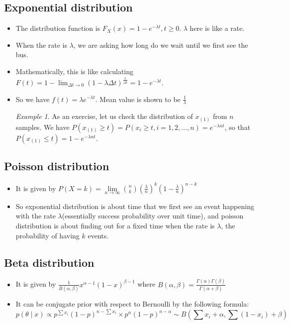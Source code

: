 \documentclass[11pt,reqno]{amsart}
\theoremstyle{remark}
\newtheorem{example}{Example}
\begin{document}
\subsection{Exponential distribution}
\begin{itemize}
\item The distribution function is $F_X(x)=1-e^{-\lambda t},t\geq 0$. $\lambda$ here is like a rate.
\item When the rate is $\lambda$, we are asking how long do we wait until we first see the bus.
\item Mathematically, this is like calculating $F(t)=1-\lim_{\Delta t\to 0}(1-\lambda\Delta t)^{\frac t{\Delta t}}=1-e^{-\lambda t}$.
\item So we have $f(t)=\lambda e^{-\lambda t}$. Mean value is shown to be $\frac 1\lambda$
\begin{example}
As an exercise, let us check the distribution of $x_{(1)}$ from $n$ samples.
We have $P(x_{(1)}\geq t)=P(x_i\geq t,i=1,2,\dots,n)=e^{-\lambda nt}$, so that $P(x_{(1)}\leq t)=1-e^{-\lambda nt}$.
\end{example}
\end{itemize}
\subsection{Poisson distribution}
\begin{itemize}
\item It is given by $P(X=k)= \lim\limits_{n\to\infty}\binom{n}{k}(\frac{\lambda}n)^k(1-\frac{\lambda}n)^{n-k}$
\item So exponential distribution is about time that we first see an event happening with the rate $\lambda$(essentially success probability over unit time), and poisson distribution is about finding out for a fixed time when the 
rate is $\lambda$, the probability of having $k$ events.
\end{itemize}
\subsection{Beta distribution}
\begin{itemize}
\item It is given by $\frac 1{B(\alpha,\beta)}x^{\alpha-1}(1-x)^{\beta-1}$ where $B(\alpha,\beta)=\frac{\Gamma(\alpha)\Gamma(\beta)}{\Gamma(\alpha+\beta)}$
\item It can be conjugate prior with respect to Bernoulli by the following formula:
$$
p(\theta\mid x)\propto p^{\sum x_i} (1-p)^{n-\sum x_i} \times p^{\alpha}(1-p)^{n-\alpha}\sim B(\sum x_i + \alpha,\sum (1-x_i)+\beta)
$$
\end{itemize}
\end{document}
